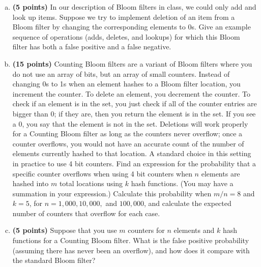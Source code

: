 \documentclass[11pt,letterpaper]{article}
\begin{document}
\pagebreak
\begin{problem}\noindent
    \begin{enumerate}[(a)]
        \item {\bf (5 points)} In our description of Bloom filters in class, we could only add and look up items. Suppose we try to implement deletion of an item from a Bloom filter by changing the corresponding elements to 0s. Give an example sequence of operations (adds, deletes, and lookups) for which this Bloom filter has both a false positive and a false negative.
        \item {\bf (15 points)} Counting Bloom filters are a variant of Bloom filters where you do not use an array of bits, but an array of small counters. Instead of changing 0s to 1s when an element hashes to a Bloom filter location, you increment the counter. To delete an element, you decrement the counter.  To check if an element is in the set, you just check if all of the counter entries are bigger than 0; if they are, then you return the element is in the set. If you see a 0, you say that the element is not in the set. Deletions will work properly for a Counting Bloom filter as long as the counters never overflow;  once a counter overflows, you would not have an accurate count of the number of elements currently hashed to that location. A standard choice in this setting in practice to use 4 bit counters. Find an expression for the probability that a specific counter overflows when using 4 bit counters when $n$ elements are hashed into $m$ total locations using $k$ hash functions.  (You may have a summation in your expression.) Calculate this probability when $m/n = 8$ and $k=5$, for $n=1,000, 10,000,$ and $100,000$, and calculate the expected number of counters that overflow for each case.  
        \item {\bf (5 points)} Suppose that you use $m$ counters for $n$ elements and $k$ hash functions for a Counting Bloom filter.  What is the false positive probability (assuming there has never been an overflow), and how does it compare with the standard Bloom filter? 
    \end{enumerate}
\end{problem}
\end{document}
